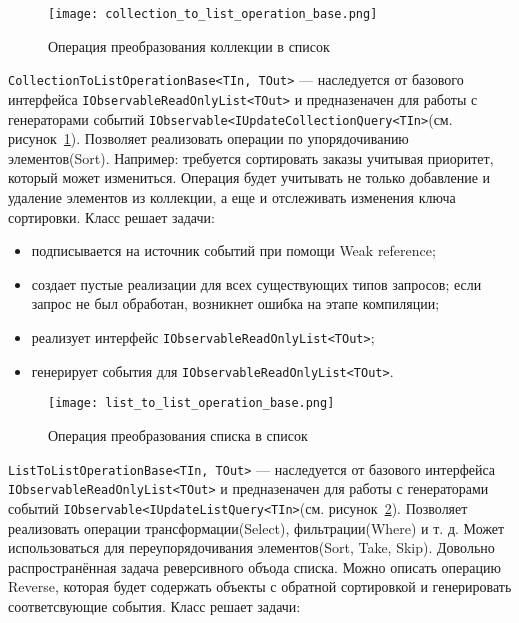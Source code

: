 \begin{figure}[ht]
\centering
  \texttt{[image: collection\_to\_list\_operation\_base.png]}
  \caption{ Операция преобразования коллекции в список }
  \label{fig:collection_to_list_operation_base}
\end{figure}

\lstinline[style=csharpinlinestyle]!CollectionToListOperationBase<TIn, TOut>! --- наследуется от базового интерфейса \lstinline[style=csharpinlinestyle]!IObservableReadOnlyList<TOut>!
и предназеначен для работы с генераторами событий \lstinline[style=csharpinlinestyle]!IObservable<IUpdateCollectionQuery<TIn>!(см. рисунок~\ref{fig:collection_to_list_operation_base}).
Позволяет реализовать операции по упорядочиванию элементов(Sort). Например: требуется сортировать заказы учитывая приоритет, который может измениться.
Операция будет учитывать не только добавление и удаление элементов из коллекции, а еще и отслеживать изменения ключа сортировки.
Класс решает задачи:

\begin{itemize}
  \item подписывается на источник событий при помощи Weak reference;
  \item создает пустые реализации для всех существующих типов запросов; если запрос не был обработан, возникнет ошибка на этапе компиляции;
  \item реализует интерфейс \lstinline[style=csharpinlinestyle]!IObservableReadOnlyList<TOut>!;
  \item генерирует события для \lstinline[style=csharpinlinestyle]!IObservableReadOnlyList<TOut>!.
\end{itemize}

\begin{figure}[ht]
\centering
  \texttt{[image: list\_to\_list\_operation\_base.png]}
  \caption{ Операция преобразования списка в список }
  \label{fig:list_to_list_operation_base}
\end{figure}

\lstinline[style=csharpinlinestyle]!ListToListOperationBase<TIn, TOut>! --- наследуется от базового интерфейса \lstinline[style=csharpinlinestyle]!IObservableReadOnlyList<TOut>!
и предназеначен для работы с генераторами событий \lstinline[style=csharpinlinestyle]!IObservable<IUpdateListQuery<TIn>!(см. рисунок~\ref{fig:list_to_list_operation_base}).
Позволяет реализовать операции трансформации(Select), фильтрации(Where) и т. д. Может использоваться для переупорядочивания элементов(Sort, Take, Skip).
Довольно распространённая задача реверсивного объода списка. Можно описать операцию Reverse, которая будет содержать объекты с обратной сортировкой и генерировать соответсвующие события.
Класс решает задачи:


